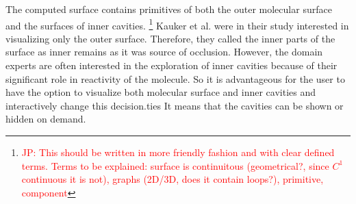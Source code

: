 
The computed surface contains primitives of both the outer molecular surface and the surfaces of inner cavities.
\footnote{\textcolor{red}{JP: This should be written in more friendly fashion and with clear defined terms.
Terms to be explained: surface is continuitous (geometrical?, since $C^1$ continuous it is not), graphs (2D/3D, does it contain loops?), primitive, component}}
Kauker et al. \cite{kauker2013rendering} were in their study interested in visualizing only the outer surface.
Therefore, they called the inner parts of the surface as inner remains as it was source of occlusion.
However, the domain experts are often interested in the exploration of inner cavities because of their significant role in reactivity of the molecule.
So it is advantageous for the user to have the option to visualize both molecular surface and inner cavities and interactively change this decision.ties
It means that the cavities can be shown or hidden on demand.


